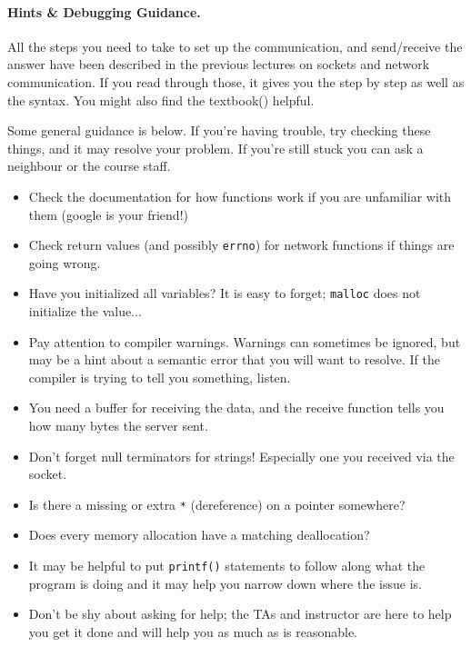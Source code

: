 \documentclass[a4paper]{report}
\begin{document}
\paragraph{Hints \& Debugging Guidance.}
All the steps you need to take to set up the communication, and send/receive the answer have been described in the previous lectures on sockets and network communication. If you read through those, it gives you the step by step as well as the syntax. You might also find the textbook(\cite{apunix}) helpful.

Some general guidance is below. If you're having trouble, try checking these things, and it may resolve your problem. If you're still stuck you can ask a neighbour or the course staff.
\begin{itemize}
	\item Check the documentation for how functions work if you are unfamiliar with them (google is your friend!)
	\item Check return values (and possibly \texttt{errno}) for network functions if things are going wrong.
	\item Have you initialized all variables? It is easy to forget; \texttt{malloc} does not initialize the value...
	\item Pay attention to compiler warnings. Warnings can sometimes be ignored, but may be a hint about a semantic error that you will want to resolve. If the compiler is trying to tell you something, listen.
	\item You need a buffer for receiving the data, and the receive function tells you how many bytes the server sent.
	\item Don't forget null terminators for strings! Especially one you received via the socket.
	\item Is there a missing or extra \texttt{*} (dereference) on a pointer somewhere?
	\item Does every memory allocation have a matching deallocation?
	\item It may be helpful to put \texttt{printf()} statements to follow along what the program is doing and it may help you narrow down where the issue is.
	\item Don't be shy about asking for help; the TAs and instructor are here to help you get it done and will help you as much as is reasonable.
\end{itemize}
\end{document}
